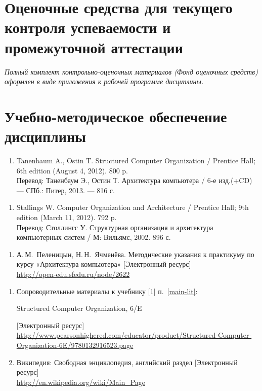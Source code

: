 \section{Оценочные средства для текущего контроля успеваемости и промежуточной аттестации}

\emph{Полный комплект контрольно-оценочных материалов (Фонд оценочных средств) оформлен в виде приложения к рабочей программе дисциплины.}

\section{Учебно-методическое обеспечение дисциплины}

	\label{main-lit}

\begin{enumerate}
	\item Tanenbaum A., Ostin T. Structured Computer Organization / Prentice Hall; 6th edition (August 4, 2012). 800 p.\\
	Перевод: Таненбаум Э., Остин Т. Архитектура компьютера / 6-е изд.(+CD) — СПб.: Питер, 2013. — 816 с.
\end{enumerate}

\begin{enumerate}
	\item Stallings W. Computer Organization and Architecture /  Prentice Hall; 9th edition (March 11, 2012). 792 p.\\
	Перевод: Столлингс У. Структурная организация и архитектура компьютерных систем / М: Вильямс, 2002. 896 с.
\end{enumerate}

	\label{author-res}
\begin{enumerate}
	\item А.\,М.~Пеленицын, Н.\,Н.~Ячменёва. Методические указания к практикуму по курсу «Архитектура компьютера» [Электронный ресурс]\\
	\url{http://open-edu.sfedu.ru/node/2622}
\end{enumerate}

	\label{online-res}
\begin{enumerate}
	\item Сопроводительные материалы к учебнику [1] п.~\ref{main-lit}:
	\begin{otherlanguage}{english}
	Structured Computer Organization, 6/E
	\end{otherlanguage}
	[Электронный ресурс]\\
	\url{http://www.pearsonhighered.com/educator/product/Structured-Computer-Organization-6E/9780132916523.page}

	\item Википедия: Свободная энциклопедия, английский раздел [Электронный ресурс]\\
	\url{http://en.wikipedia.org/wiki/Main_Page}
\end{enumerate}

